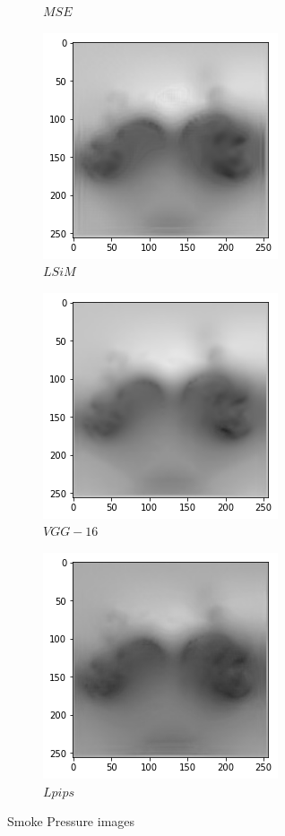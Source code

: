 \documentclass[a4paper,12pt,twoside]{report}
\begin{document}
\begin{figure}
\begin{subfigure}{0.32\textwidth}
		\caption{$MSE$}
	\end{subfigure}
	\begin{subfigure}{0.32\textwidth}
		\centering
		\includegraphics[scale=0.4]{superresolution/pressure_lsim.png}
		\caption{$LSiM$}
	\end{subfigure}
	\begin{subfigure}{0.32\textwidth}
		\centering
		\includegraphics[scale=0.4]{superresolution/pressure_vgg.png}
		\caption{$VGG-16$}
	\end{subfigure}
	\begin{subfigure}{0.32\textwidth}
		\centering
		\includegraphics[scale=0.4]{superresolution/pressure_lpips.png}
		\caption{$Lpips$}
	\end{subfigure}
	\caption{Smoke Pressure images}
\end{figure}
\end{document}
